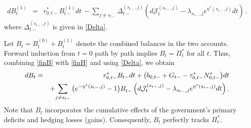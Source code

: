 \documentclass[12pt]{article}
\begin{document}
\begin{eqnarray} \label{finH}
d B^{(1)}_t  %
& = &   {r_{0,t-}^*} B^{(1)}_{t-}d t \,  -  {\sum_{j\neq s_{t-}}
 	\Delta_{t-}^{(s_{t-}, j)}
	 \left(d {\mathcal J}_t^{(s_{t-}, j)} - \lambda_{s_{t-}, j}e^{\eta^*(s_{t-}, j)}d t \right)}  \, . %
\end{eqnarray}
where $\Delta_{t-}^{(s_{t-}, j)}$ is given in  \eqref{Delta}. 

Let $B_t = B^{(0)}_t + B^{(1)}_t$ denote the  combined balances in  the two accounts. Forward induction from $t=0$ path by path implies $B_t= \Pi_t^\ast$ for all $t$. Thus, combining \eqref{finB} with \eqref{finH} and using  \eqref{Delta}, we obtain 
 \begin{eqnarray} \label{finH}
d B_t  %
& = &   {r_{0,t-}^*} B_{t-} d t  + \big(b_{0, t-} +G_{t-}-\tau_{0, t-} ^\ast N_{0, t-}^\ast\big)dt  \notag \\
&&  + {\sum_{j\neq s_{t-}} \big(e^{-\eta^*(s_{t-}, j)}-1 \big)B_{t-}^{} \left(d {\mathcal J}_t^{(s_{t-}, j)} - \lambda_{s_{t-}, j}e^{\eta^*(s_{t-}, j)}d t \right)}  \, . %
\end{eqnarray}
Note that $B_t $ incorporates the cumulative effects of the government's primary deficits and   hedging losses (gains). Consequently,  $B_t$ perfectly tracks $\Pi_t^\ast$. 
\end{document}
